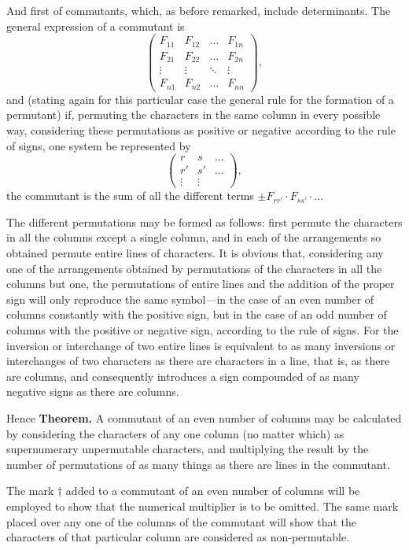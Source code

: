\documentclass[11pt,a4paper]{article}
\theoremstyle{plain}
\begin{document}
And first of commutants, which, as before remarked, include determinants. The general expression of a commutant is
\[\begin{pmatrix} F_{11} & F_{12} & \ldots & F_{1n} \\ F_{21} & F_{22} & \ldots & F_{2n} \\ \vdots & \vdots & \ddots & \vdots \\ F_{n1} & F_{n2} & \ldots & F_{nn} \end{pmatrix},\]
and (stating again for this particular case the general rule for the formation of a permutant) if, permuting the characters in the same column in every possible way, considering these permutations as positive or negative according to the rule of signs, one system be represented by
\[\begin{pmatrix} r & s & \ldots \\ r' & s' & \ldots \\ \vdots & \vdots \end{pmatrix},\]
the commutant is the sum of all the different terms $\pm F_{rr'} \cdot F_{ss'} \cdot \ldots$

The different permutations may be formed as follows: first permute the characters in all the columns except a single column, and in each of the arrangements so obtained permute entire lines of characters. It is obvious that, considering any one of the arrangements obtained by permutations of the characters in all the columns but one, the permutations of entire lines and the addition of the proper sign will only reproduce the same symbol---in the case of an even number of columns constantly with the positive sign, but in the case of an odd number of columns with the positive or negative sign, according to the rule of signs. For the inversion or interchange of two entire lines is equivalent to as many inversions or interchanges of two characters as there are characters in a line, that is, as there are columns, and consequently introduces a sign compounded of as many negative signs as there are columns.

Hence \textbf{Theorem.} A commutant of an even number of columns may be calculated by considering the characters of any one column (no matter which) as supernumerary unpermutable characters, and multiplying the result by the number of permutations of as many things as there are lines in the commutant.

The mark $\dagger$ added to a commutant of an even number of columns will be employed to show that the numerical multiplier is to be omitted. The same mark placed over any one of the columns of the commutant will show that the characters of that particular column are considered as non-permutable.
\end{document}
